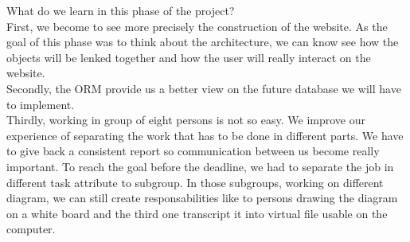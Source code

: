 What do we learn in this phase of the project?\\
First, we become to see more precisely the construction of the website. As the goal of this phase was to think about the architecture, we can know see how the objects will be lenked together and how the user will really interact on the website.\\
Secondly, the ORM provide us a better view on the future database we will have to implement.\\
Thirdly, working in group of eight persons is not so easy. We improve our experience of separating the work that has to be done in different parts. We have to give back a consistent report so communication between us become really important. To reach the goal before the deadline, we had to separate the job in different task attribute to subgroup. In those subgroups, working on different diagram, we can still create responsabilities like to persons drawing the diagram on a white board and the third one transcript it into virtual file usable on the computer.\\